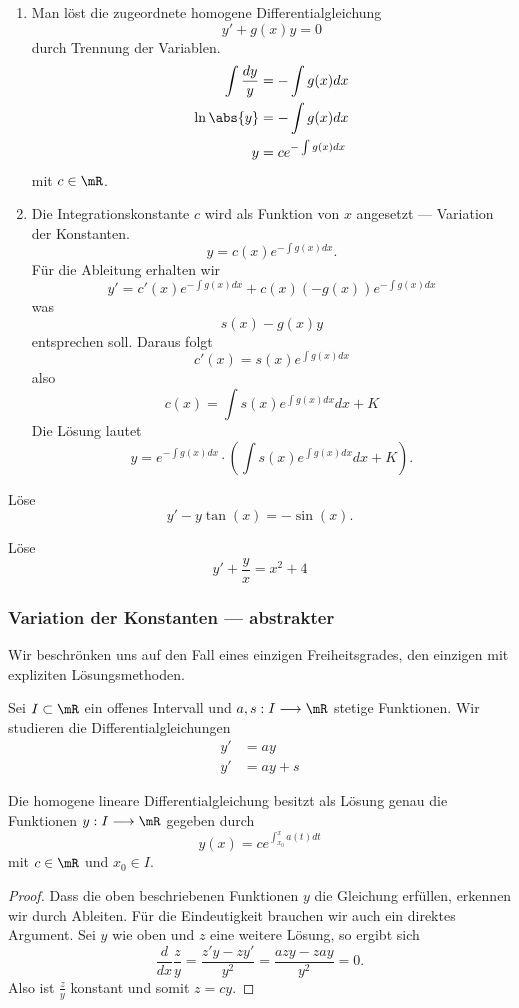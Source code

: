 \documentclass[%
11pt,%
twoside,%
titlepage,%
german,%
headsepline%
]{scrartcl}
\begin{document}
\begin{enumerate}
\item Man l\"ost die zugeordnete homogene Differentialgleichung
$$y'+g(x)y=0$$
durch Trennung der Variablen.
\begin{align*}
\int\frac{dy}{y} &= -\int g(x)dx\\
\ln\abs{y} &= -\int g(x)dx\\
y &= ce^{-\int g(x)dx}
\end{align*}
mit $c\in\mR$.
\item Die
Integrationskonstante $c$ wird als Funktion von $x$ angesetzt --- Variation der Konstanten.
$$y=c(x)e^{-\int g(x)dx}.$$
F\"ur die Ableitung erhalten wir
$$y' = c'(x)e^{-\int g(x)dx}+c(x)(-g(x))e^{-\int g(x)dx}$$
was
$$s(x)-g(x)y$$
entsprechen soll. Daraus folgt
$$c'(x)=s(x)e^{\int g(x)dx}$$
also
$$c(x)=\int s(x)e^{\int g(x)dx}dx+K$$
Die L\"osung lautet
$$y=e^{-\int g(x)dx}\cdot\left(\int s(x)e^{\int g(x)dx}dx+K\right).$$
\end{enumerate}

\begin{ueb}
L\"ose
$$y'-y\tan(x)=-\sin(x).$$
\end{ueb}

\begin{ueb}
L\"ose
$$y'+\frac{y}{x}=x^2+4$$
\end{ueb}

\subsubsection{Variation der Konstanten --- abstrakter}

Wir beschr\"onken uns auf den Fall eines einzigen Freiheitsgrades, den einzigen mit expliziten L\"osungsmethoden.

Sei $I\subset\mR$ ein offenes Intervall und $a,s:I\longrightarrow\mR$ stetige Funktionen. Wir studieren die Differentialgleichungen
\begin{align}
y' &= ay\\
y' &=ay+s
\end{align}

\begin{satz}
Die homogene lineare Differentialgleichung besitzt als L\"osung genau die Funktionen $y:I\longrightarrow\mR$ gegeben durch
$$y(x)=ce^{\int_{x_0}^xa(t)dt}$$
mit $c\in\mR$ und $x_0\in I$.
\end{satz}

\begin{proof}
Dass die oben beschriebenen Funktionen $y$ die Gleichung erf\"ullen, erkennen wir durch Ableiten. F\"ur die Eindeutigkeit brauchen wir auch ein direktes Argument. Sei $y$ wie oben und $z$ eine weitere L\"osung, so ergibt sich
$$\frac{d}{dx}\frac{z}{y}=\frac{z'y-zy'}{y^2}=\frac{azy-zay}{y^2}=0.$$
Also ist $\frac{z}{y}$ konstant und somit $z=cy$.
\end{proof}
\end{document}

